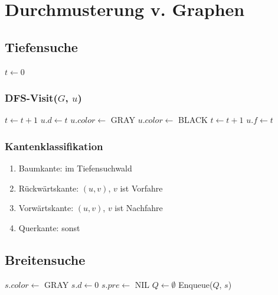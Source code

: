 \section*{Durchmusterung v. Graphen}

\subsection*{Tiefensuche}
\begin{algorithm}[H]
	$t \gets 0$\;
\end{algorithm}

\subsubsection*{DFS-Visit($G$, $u$)}
\begin{algorithm}[H]
	$t \gets t+1$\;
	$u.d \gets t$\;
	$u.color \gets$ GRAY\;
	$u.color \gets$ BLACK\;
	$t \gets t + 1$\;
	$u.f \gets t$\;
\end{algorithm}

\subsubsection*{Kantenklassifikation}
\begin{enumerate}
	\item Baumkante: im Tiefensuchwald
	\item Rückwärtskante: $(u,v)$, $v$ ist Vorfahre
	\item Vorwärtskante: $(u,v)$, $v$ ist Nachfahre
	\item Querkante: sonst
\end{enumerate}

\subsection*{Breitensuche}
\begin{algorithm}[H]
	$s.color \gets$ GRAY\;
	$s.d \gets 0$\;
	$s.pre \gets$ NIL\;
	$Q \gets \emptyset$\;
	Enqueue($Q$, $s$)\;
\end{algorithm}

